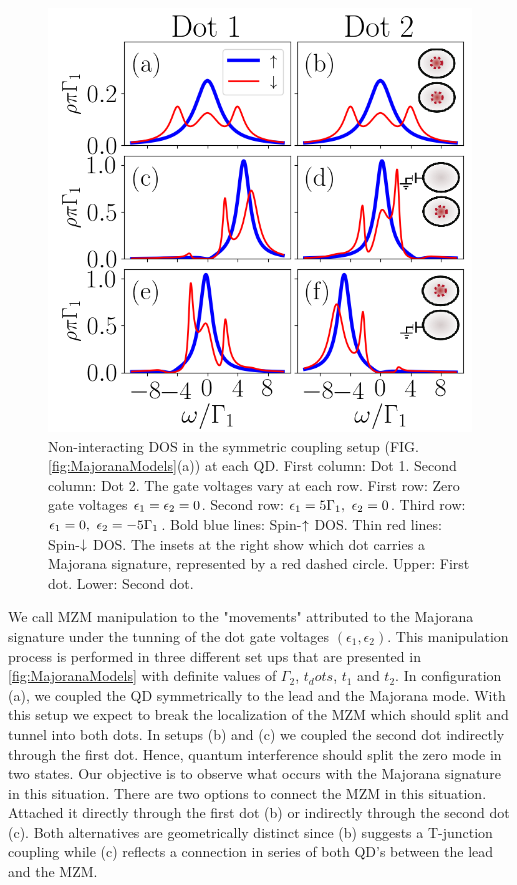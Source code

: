 \documentclass[showpacs,aps,prb,reprint,superscriptaddress]{revtex4-1}
\begin{document}
	\begin{figure}[bt]
		\begin{center}
		\includegraphics[scale=0.48]{Graficos/t1=t2.png}
		\caption{ \label{fig:t1=t2}  Non-interacting DOS in the symmetric coupling setup (FIG.\ref{fig:MajoranaModels}(a)) at each QD. First column: Dot 1. Second column: Dot 2. The gate voltages vary at each row.  First row: Zero gate voltages $\epsilon_1=\epsilon_2=0$. Second row: $\epsilon_1=5\Gamma_1, \ \epsilon_2 =0$.  Third row: $\epsilon_1=0, \ \epsilon_2 =-5\Gamma_1$.  Bold blue lines: Spin-$\uparrow$ DOS. Thin red lines: Spin-$\downarrow$ DOS. The insets at the right show which dot carries a Majorana signature, represented by a red dashed circle. Upper: First dot. Lower: Second dot. 
		}
	\end{center}
	\end{figure}

We call MZM manipulation to the "movements" attributed to the Majorana signature under the tunning of the dot gate voltages $( \epsilon_1 , \epsilon_2 )$. This manipulation process is performed in three different set ups that are presented in \ref{fig:MajoranaModels} with definite values of $\Gamma_2$, $t_dots$, $t_1$ and $t_2$. In configuration (a), we coupled the QD symmetrically to the lead and the Majorana mode. With this setup we expect to break the localization of the MZM which should split and tunnel into both dots. In setups (b) and (c) we coupled the second dot indirectly through the first dot. Hence, quantum  interference should split the zero mode in two states. Our objective is to observe what occurs with the Majorana signature in this situation. There are two options to connect the MZM in this situation. Attached it directly through the first dot (b) or indirectly through the second dot (c). Both alternatives are geometrically distinct since (b) suggests a T-junction coupling while (c) reflects a connection  in series of both QD's between the lead and the MZM. 
\end{document}
